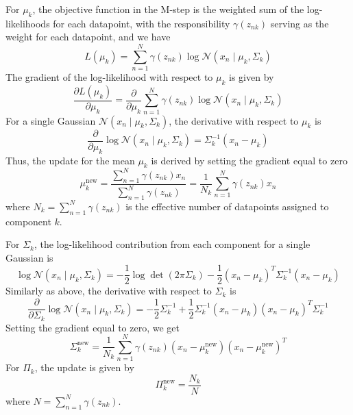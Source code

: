 For \(\mu_k\), the objective function in the M-step is the weighted sum of the log-likelihoods for each datapoint, with the responsibility \(\gamma(z_{n k})\) serving as the weight for each datapoint, and we have
\[
    L(\mu_k) = \sum_{n=1}^N \gamma(z_{n k}) \log \mathcal{N}(x_n \mid \mu_k, \Sigma_k)
\]
The gradient of the log-likelihood with respect to \(\mu_k\) is given by
\[
    \frac{\partial L(\mu_k)}{\partial \mu_k}
    =
    \frac{\partial}{\partial \mu_k} \sum_{n=1}^N \gamma(z_{n k}) \log \mathcal{N}(x_n \mid \mu_k, \Sigma_k)
\]
For a single Gaussian \(\mathcal{N}(x_n \mid \mu_k, \Sigma_k)\), the derivative with respect to \(\mu_k\) is
\[
    \frac{\partial}{\partial \mu_k} \log \mathcal{N}(x_n \mid \mu_k, \Sigma_k) = \Sigma_k^{-1}(x_n - \mu_k)
\]
Thus, the update for the mean \(\mu_k\) is derived by setting the gradient equal to zero
\[
    \mu_k^{\text{new}} = \frac{\sum_{n=1}^N \gamma(z_{n k}) x_n}{\sum_{n=1}^N \gamma(z_{n k})} = \frac{1}{N_k} \sum_{n=1}^N \gamma(z_{n k}) x_n
\]
where \(N_k = \sum_{n=1}^N \gamma(z_{n k})\) is the effective number of datapoints assigned to component \(k\).

For \(\Sigma_k\), the log-likelihood contribution from each component for a single Gaussian is
\[
    \log \mathcal{N}(x_n \mid \mu_k, \Sigma_k) = -\frac{1}{2} \log \det(2 \pi \Sigma_k) - \frac{1}{2} (x_n - \mu_k)^T \Sigma_k^{-1} (x_n - \mu_k)
\]
Similarly as above, the derivative with respect to \(\Sigma_k\) is
\[
    \frac{\partial}{\partial \Sigma_k} \log \mathcal{N}(x_n \mid \mu_k, \Sigma_k) = -\frac{1}{2} \Sigma_k^{-1} + \frac{1}{2} \Sigma_k^{-1} (x_n - \mu_k) (x_n - \mu_k)^T \Sigma_k^{-1}
\]
Setting the gradient equal to zero, we get
\[
    \Sigma_k^{\text{new}} = \frac{1}{N_k} \sum_{n=1}^N \gamma(z_{n k}) (x_n - \mu_k^{\text{new}}) (x_n - \mu_k^{\text{new}})^T
\]
For \(\Pi_k\), the update is given by
\[
    \Pi_k^{\text{new}} = \frac{N_k}{N}
\]
where \(N = \sum_{n=1}^N \gamma(z_{n k})\).
